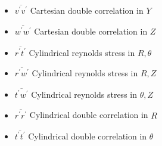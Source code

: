 \begin{itemize}[label={}]
\item	$\overline{v^\prime v^\prime}$	\tabto{1in}	Cartesian double 
correlation in $Y$
\item	$\overline{w^\prime w^\prime}$	\tabto{1in}	Cartesian double 
correlation in  $Z$
\item	$\overline{r^\prime t^\prime}$	\tabto{1in}	Cylindrical reynolds stress 
in $R, \theta$
\item	$\overline{r^\prime w^\prime}$	\tabto{1in}	Cylindrical reynolds stress 
in $R, Z$
\item	$\overline{t^\prime w^\prime}$	\tabto{1in}	Cylindrical reynolds stress 
in $\theta, Z$
\item	$\overline{r^\prime r^\prime}$	\tabto{1in}	Cylindrical double 
correlation in $R$
\item	$\overline{t^\prime t^\prime}$	\tabto{1in}	Cylindrical double 
correlation in $\theta$



\end{itemize}
